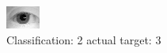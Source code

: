 \begin{figure}[h!]
\begin{center}
\includegraphics[width=0.60\columnwidth]{figures/ID1172_class_2_target_3.png}
\end{center}
\caption{ Classification: 2 actual target: 3}
\label{fig:ID1172_class_2_target_3}
\end{figure}
